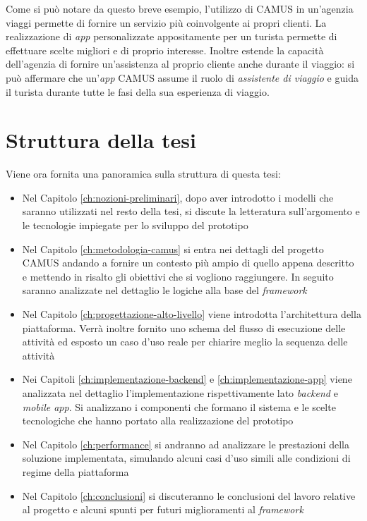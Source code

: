 Come si può notare da questo breve esempio, l'utilizzo di CAMUS in un'agenzia viaggi permette di fornire un servizio più coinvolgente ai propri clienti. La realizzazione di \emph{app} personalizzate appositamente per un turista permette di effettuare scelte migliori e di proprio interesse. Inoltre estende la capacità dell'agenzia di fornire un'assistenza al proprio cliente anche durante il viaggio: si può affermare che un'\emph{app} CAMUS assume il ruolo di \emph{assistente di viaggio} e guida il turista durante tutte le fasi della sua esperienza di viaggio.

\section{Struttura della tesi}

Viene ora fornita una panoramica sulla struttura di questa tesi:

\begin{itemize}
	\item 
	Nel Capitolo \ref{ch:nozioni-preliminari}, dopo aver introdotto i modelli che saranno utilizzati nel resto della tesi, si discute la letteratura sull'argomento e le tecnologie impiegate per lo sviluppo del prototipo
	\item 
	Nel Capitolo \ref{ch:metodologia-camus} si entra nei dettagli del progetto CAMUS andando a fornire un contesto più ampio di quello appena descritto e mettendo in risalto gli obiettivi che si vogliono raggiungere. In seguito saranno analizzate nel dettaglio le logiche alla base del \emph{framework}
	\item 
	Nel Capitolo \ref{ch:progettazione-alto-livello} viene introdotta l'architettura della piattaforma. Verrà inoltre fornito uno schema del flusso di esecuzione delle attività ed esposto un caso d'uso reale per chiarire meglio la sequenza delle attività
	\item 
	Nei Capitoli \ref{ch:implementazione-backend} e \ref{ch:implementazione-app} viene analizzata nel dettaglio l'implementazione rispettivamente lato \emph{backend} e \emph{mobile app}. Si analizzano i componenti che formano il sistema e le scelte tecnologiche che hanno portato alla realizzazione del prototipo
	\item 
	Nel Capitolo \ref{ch:performance} si andranno ad analizzare le prestazioni della soluzione implementata, simulando alcuni casi d'uso simili alle condizioni di regime della piattaforma
	\item 
	Nel Capitolo \ref{ch:conclusioni} si discuteranno le conclusioni del lavoro relative al progetto e alcuni spunti per futuri miglioramenti al \emph{framework}
\end{itemize}